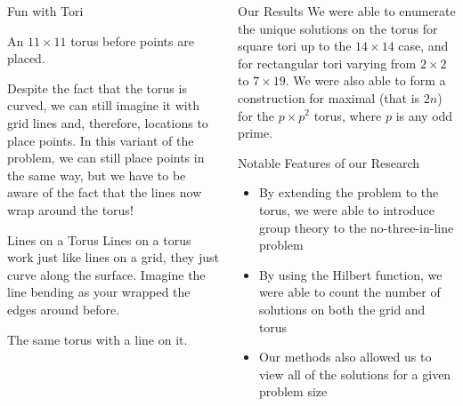 \documentclass[12pt,serif,mathserif,final]{beamer}
\begin{document}
\begin{frame}[t]
\begin{columns}[t]
\begin{column}{0.32\linewidth}
      \begin{block}{Fun with Tori}
        \begin{center}

            An $11\times 11$ torus before points are placed.
        \end{center}
        Despite the fact that the torus is curved, we can still imagine 
        it with grid lines and, therefore, locations to place points.
        In this variant of the problem, we can still place points in the
        same way, but we have to be aware of the fact that the lines now
        wrap around the torus!
      \end{block}

      \begin{block}{Lines on a Torus}
        Lines on a torus work just like lines on a grid, they just curve along
        the surface.  Imagine the line bending as your wrapped the edges around
        before.
        \begin{center}

            The same torus with a line on it.
        \end{center}
      \end{block}

    \end{column}%

    \begin{column}{0.32\linewidth}

      \begin{block}{Our Results}
        We were able to enumerate the unique solutions on the torus for square
        tori up to the $14 \times 14$ case, and for rectangular tori varying from 
        $2 \times 2$ to $7 \times 19$.  We were also able to form a construction 
        for maximal (that is $2n$) for the $p \times p^2$ torus, where $p$ is any
        odd prime.
      \end{block}

      \begin{block}{Notable Features of our Research}
        \begin{itemize}
            \item By extending the problem to the torus, we were able to introduce
                group theory to the no-three-in-line problem
            \item By using the Hilbert function, we were able to count the number
                of solutions on both the grid and torus
            \item Our methods also allowed us to view all of the solutions for
                a given problem size
        \end{itemize}
      \end{block}


\end{column}
\end{columns}
\end{frame}
\end{document}
